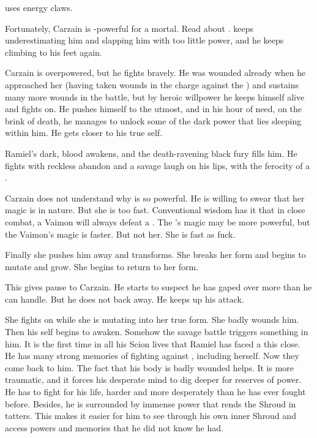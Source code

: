 \Takestsha uses energy claws. 

Fortunately, Carzain is \uber-powerful for a mortal. 
Read about . 
\Takestsha keeps underestimating him and slapping him with too little power, and he keeps climbing to his feet again. 

Carzain is overpowered, but he fights bravely. 
He was wounded already when he approached her (having taken wounds in the charge against the \ishrah) and sustains many more wounds in the battle, but by heroic willpower he keeps himself alive and fights on. 
He pushes himself to the utmost, and in his hour of need, on the brink of death, he manages to unlock some of the dark power that lies sleeping within him. 
He gets closer to his true self. 

Ramiel's dark, \draconic{} blood awakens, and the death-ravening black fury fills him. 
He fights with reckless abandon and a savage laugh on his lips, with the ferocity of a \dragon{}. 

Carzain does not understand why \Takestsha is so powerful.
He is willing to swear that her magic is \rethyactic in nature.
But she is too fast. 
Conventional wisdom has it that in close combat, a Vaimon will always defeat a \rethyax. 
The \rethyax's magic may be more powerful, but the Vaimon's magic is faster. 
But not her. 
She is fast as fuck. 

Finally she pushes him away and transforms. 
She breaks her \human form and begins to mutate and grow. 
She begins to return to her \draconian form.

This gives pause to Carzain. 
He starts to suspect he has gaped over more than he can handle. 
But he does not back away.
He keeps up his attack. 

She fights on while she is mutating into her true form. 
She badly wounds him. 
Then his \malach self begins to awaken. 
Somehow the savage battle triggers something in him.
It is the first time in all his Scion lives that Ramiel has faced a \dragon this close. 
He has many strong memories of fighting against \dragons, including \Nzessuacrith herself. 
Now they come back to him. 
The fact that his body is badly wounded helps. 
It is more traumatic, and it forces his desperate mind to dig deeper for reserves of power. 
He has to fight for his life, harder and more desperately than he has ever fought before. 
Besides, he is surrounded by immense power that rends the Shroud in tatters. 
This makes it easier for him to see through his own inner Shroud and access powers and memories that he did not know he had. 

